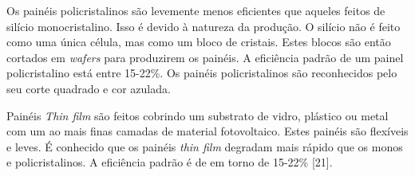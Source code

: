 Os painéis policristalinos são levemente menos eficientes que aqueles feitos de silício monocristalino. Isso é devido à natureza da produção. O silício não é feito como uma única célula, mas como um bloco de cristais. Estes blocos são então cortados em \emph{wafers} para produzirem os painéis. A eficiência padrão de um painel policristalino está entre 15-22\%. Os painéis policristalinos são reconhecidos pelo seu corte quadrado e cor azulada.
   
Painéis \emph{Thin film} são feitos cobrindo um substrato de vidro, plástico ou metal com um ao mais finas camadas de material fotovoltaico. Estes painéis são flexíveis e leves. É conhecido que os painéis \emph{thin film} degradam mais rápido que os monos e policristalinos. A eficiência padrão é de em torno de 15-22\% [21].